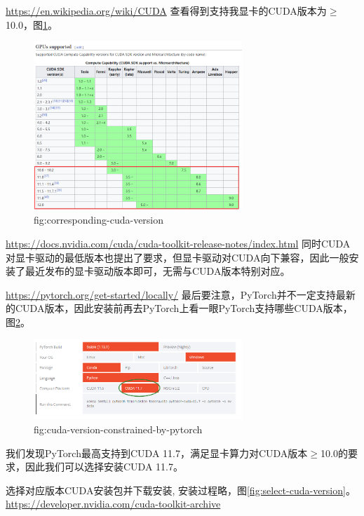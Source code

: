 \url{https://en.wikipedia.org/wiki/CUDA}
查看得到支持我显卡的CUDA版本为$\geq$10.0，图\ref{fig:corresponding-cuda-version}。
\begin{figure}[htbp]
    \centering
    \includegraphics[width=0.7\textwidth]{figures/corresponding-cuda-version.png}
    \caption{fig:corresponding-cuda-version}
    \label{fig:corresponding-cuda-version}
\end{figure}

\url{https://docs.nvidia.com/cuda/cuda-toolkit-release-notes/index.html}
同时CUDA对显卡驱动的最低版本也提出了要求，但显卡驱动对CUDA向下兼容，因此一般安装了最近发布的显卡驱动版本即可，无需与CUDA版本特别对应。


\url{https://pytorch.org/get-started/locally/}
最后要注意，PyTorch并不一定支持最新的CUDA版本，因此安装前再去PyTorch上看一眼PyTorch支持哪些CUDA版本，图\ref{fig:cuda-version-constrained-by-pytorch}。
\begin{figure}[htbp]
    \centering
    \includegraphics[width=0.7\textwidth]{figures/cuda-version-constrained-by-pytorch.png}
    \caption{fig:cuda-version-constrained-by-pytorch}
    \label{fig:cuda-version-constrained-by-pytorch}
\end{figure}

我们发现PyTorch最高支持到CUDA 11.7，满足显卡算力对CUDA版本$\geq$10.0的要求，因此我们可以选择安装CUDA 11.7。

选择对应版本CUDA安装包并下载安装, 安装过程略，图\ref{fig:select-cuda-version}。
\url{https://developer.nvidia.com/cuda-toolkit-archive}

